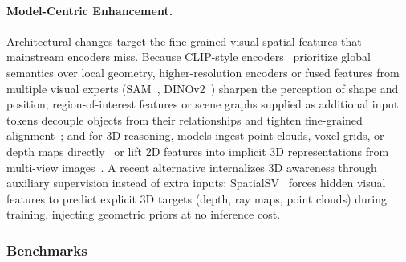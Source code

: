 \paragraph{Model-Centric Enhancement.}
Architectural changes target the fine-grained visual-spatial features that mainstream encoders miss.
Because CLIP-style encoders~\cite{radford2021learning} prioritize global semantics over local geometry, higher-resolution encoders or fused features from multiple visual experts (SAM~\cite{kirillov2023sam, ravi2024sam2, carion2025sam}, DINOv2~\cite{dinov2}) sharpen the perception of shape and position; region-of-interest features or scene graphs supplied as additional input tokens decouple objects from their relationships and tighten fine-grained alignment~\cite{guo2024regiongpt}; and for 3D reasoning, models ingest point clouds, voxel grids, or depth maps directly~\cite{wangspatial} or lift 2D features into implicit 3D representations from multi-view images~\cite{zhu2024llava}.
A recent alternative internalizes 3D awareness through auxiliary supervision instead of extra inputs: SpatialSV~\cite{tang2026spatialsv} forces hidden visual features to predict explicit 3D targets (depth, ray maps, point clouds) during training, injecting geometric priors at no inference cost.



\subsubsection{Benchmarks}



